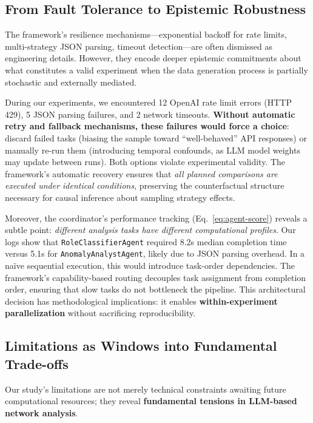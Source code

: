 \subsection{From Fault Tolerance to Epistemic Robustness}

The framework's resilience mechanisms---exponential backoff for rate limits, multi-strategy JSON parsing, timeout detection---are often dismissed as engineering details. However, they encode deeper epistemic commitments about what constitutes a valid experiment when the data generation process is partially stochastic and externally mediated.

During our experiments, we encountered 12 OpenAI rate limit errors (HTTP 429), 5 JSON parsing failures, and 2 network timeouts. \textbf{Without automatic retry and fallback mechanisms, these failures would force a choice}: discard failed tasks (biasing the sample toward ``well-behaved'' API responses) or manually re-run them (introducing temporal confounds, as LLM model weights may update between runs). Both options violate experimental validity. The framework's automatic recovery ensures that \textit{all planned comparisons are executed under identical conditions}, preserving the counterfactual structure necessary for causal inference about sampling strategy effects.

Moreover, the coordinator's performance tracking (Eq.~\ref{eq:agent-score}) reveals a subtle point: \textit{different analysis tasks have different computational profiles}. Our logs show that \texttt{RoleClassifierAgent} required 8.2s median completion time versus 5.1s for \texttt{AnomalyAnalystAgent}, likely due to JSON parsing overhead. In a naïve sequential execution, this would introduce task-order dependencies. The framework's capability-based routing decouples task assignment from completion order, ensuring that slow tasks do not bottleneck the pipeline. This architectural decision has methodological implications: it enables \textbf{within-experiment parallelization} without sacrificing reproducibility.

\subsection{Limitations as Windows into Fundamental Trade-offs}

Our study's limitations are not merely technical constraints awaiting future computational resources; they reveal \textbf{fundamental tensions in LLM-based network analysis}.

